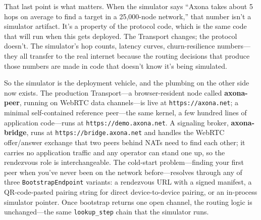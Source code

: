 \documentclass[nobib,justified]{tufte-handout}
\begin{document}
That last point is what matters. When the simulator says ``Axona takes about 5 hops on average to find a target in a 25{,}000-node network,'' that number isn't a simulator artifact. It's a property of the protocol code, which is the same code that will run when this gets deployed. The Transport changes; the protocol doesn't. The simulator's hop counts, latency curves, churn-resilience numbers---they all transfer to the real internet because the routing decisions that produce those numbers are made in code that doesn't know it's being simulated.

So the simulator is the deployment vehicle, and the plumbing on the other side now exists. The production Transport---a browser-resident node called \textbf{axona-peer}, running on WebRTC data channels---is live at \texttt{https://axona.net}; a minimal self-contained reference peer---the same kernel, a few hundred lines of application code---runs at \texttt{https://demo.axona.net}. A signaling broker, \textbf{axona-bridge}, runs at \texttt{https://bridge.axona.net} and handles the WebRTC offer/answer exchange that two peers behind NATs need to find each other; it carries no application traffic and any operator can stand one up, so the rendezvous role is interchangeable. The cold-start problem---finding your first peer when you've never been on the network before---resolves through any of three \texttt{BootstrapEndpoint} variants: a rendezvous URL with a signed manifest, a QR-code-pasted pairing string for direct device-to-device pairing, or an in-process simulator pointer. Once bootstrap returns one open channel, the routing logic is unchanged---the same \texttt{lookup\_step} chain that the simulator runs.
\end{document}
